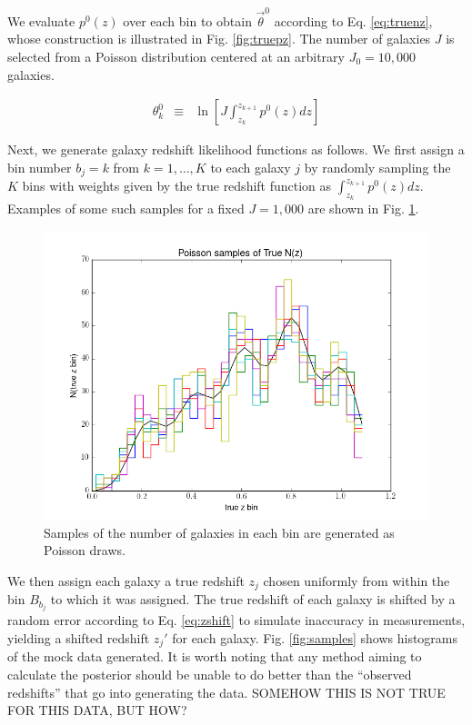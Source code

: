 \documentclass[12pt, onecolumn]{emulateapj}
\begin{document}
We evaluate $p^{0}(z)$ over each bin to obtain $\vec{\theta}^{0}$ according to Eq. \ref{eq:truenz}, whose construction is illustrated in Fig. \ref{fig:truepz}.  The number of galaxies $J$ is selected from a Poisson distribution centered at an arbitrary $J_{0}=10,000$ galaxies.

\begin{eqnarray}
\label{eq:truenz}
\theta_{k}^{0} &\equiv& \ln\left[J\int_{z_{k}}^{z_{k+1}}p^{0}(z) dz\right]
\end{eqnarray}

Next, we generate galaxy redshift likelihood functions as follows.  We first assign a bin number $b_{j}=k$ from $k=1,\dots,K$ to each galaxy $j$ by randomly sampling the $K$ bins with weights given by the true redshift function as $\int_{z_{k}}^{z_{k+1}}p^{0}(z)dz$.  Examples of some such samples for a fixed $J=1,000$ are shown in Fig. \ref{fig:obsnz}.

\begin{figure}
\label{fig:obsnz}
\includegraphics[scale=0.5]{obsNz.png}
\caption{Samples of the number of galaxies in each bin are generated as Poisson draws.}
\end{figure}

We then assign each galaxy a true redshift $z_{j}$ chosen uniformly from within the bin $B_{b_{j}}$ to which it was assigned.  The true redshift of each galaxy is shifted by a random error according to Eq. \ref{eq:zshift} to simulate inaccuracy in measurements, yielding a shifted redshift $z_{j}'$ for each galaxy.  Fig. \ref{fig:samples} shows histograms of the mock data generated.  It is worth noting that any method aiming to calculate the posterior should be unable to do better than the ``observed redshifts'' that go into generating the data.  SOMEHOW THIS IS NOT TRUE FOR THIS DATA, BUT HOW?
\end{document}
